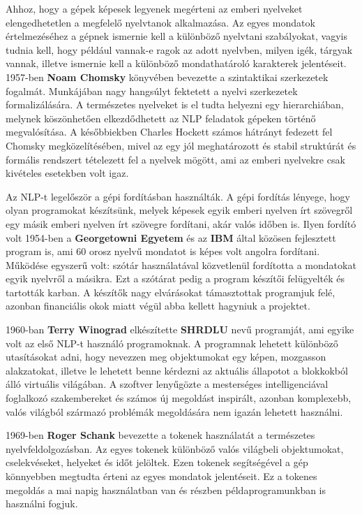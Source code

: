 Ahhoz, hogy a gépek képesek legyenek megérteni az emberi nyelveket elengedhetetlen a megfelelő nyelvtanok alkalmazása. Az egyes mondatok értelmezéséhez a gépnek ismernie kell a különböző nyelvtani szabályokat, vagyis tudnia kell, hogy például vannak-e ragok az adott nyelvben, milyen igék, tárgyak vannak, illetve ismernie kell a különböző mondathatároló karakterek jelentéseit. 1957-ben \textbf{Noam Chomsky} könyvében\cite{chomsky} bevezette a szintaktikai szerkezetek fogalmát. Munkájában nagy hangsúlyt fektetett a nyelvi szerkezetek formalizálására. A természetes nyelveket is el tudta helyezni egy hierarchiában, melynek köszönhetően elkezdődhetett az NLP feladatok gépeken történő megvalósítása. A későbbiekben Charles Hockett számos hátrányt fedezett fel Chomsky megközelítésében, mivel az egy jól meghatározott és stabil struktúrát és formális rendszert tételezett fel a nyelvek mögött, ami az emberi nyelvekre csak kivételes esetekben volt igaz.

Az NLP-t legelőször a gépi fordításban használták. A gépi fordítás lényege, hogy olyan programokat készítsünk, melyek képesek egyik emberi nyelven írt szövegről egy másik emberi nyelven írt szövegre fordítani, akár valós időben is. Ilyen fordító volt 1954-ben a \textbf{Georgetowni Egyetem} és az \textbf{IBM} által közösen fejlesztett program\cite{ibm_trans} is, ami 60 orosz nyelvű mondatot is képes volt angolra fordítani. Működése egyszerű volt: szótár használatával közvetlenül fordította a mondatokat egyik nyelvről a másikra. Ezt a szótárat pedig a program készítői felügyelték és tartották karban. A készítők nagy elvárásokat támasztottak programjuk felé, azonban financiális okok miatt végül abba kellett hagyniuk a projektet.\cite{history}

1960-ban \textbf{Terry Winograd} elkészítette \textbf{SHRDLU} nevű programját\cite{history}, ami egyike volt az első NLP-t használó programoknak. A programnak lehetett különböző utasításokat adni, hogy nevezzen meg objektumokat egy képen, mozgasson alakzatokat, illetve le lehetett benne kérdezni az aktuális állapotot a blokkokból álló virtuális világában. A szoftver lenyűgözte a mesterséges intelligenciával foglalkozó szakembereket és számos új megoldást inspirált, azonban komplexebb, valós világból származó problémák megoldására nem igazán lehetett használni.

1969-ben \textbf{Roger Schank} bevezette a tokenek használatát a természetes \\
nyelvfeldolgozásban.\cite{history} Az egyes tokenek különböző valós világbeli objektumokat, cselekvéseket, helyeket és időt jelöltek. Ezen tokenek segítségével a gép könnyebben megtudta érteni az egyes mondatok jelentéseit. Ez a tokenes megoldás a mai napig használatban van és részben példaprogramunkban is használni fogjuk.

